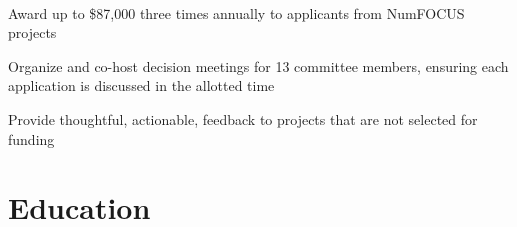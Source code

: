
\\
\begin{tightemize}
\item Award up to \$87,000 three times annually to applicants from NumFOCUS projects
\item Organize and co-host decision meetings for 13 committee members, ensuring each application is discussed in the allotted time
\item Provide thoughtful, actionable, feedback to projects that are not selected for funding
\end{tightemize}
\sectionsep


\section{Education}



\sectionsep


